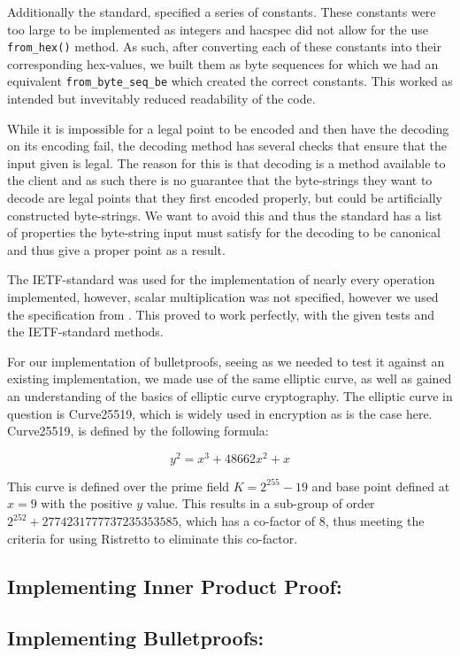 \documentclass{article}
\begin{document}
Additionally the standard, specified a series of constants. These
constants were too large to be implemented as integers and hacspec
did not allow for the use \texttt{from\_hex()} method. As such, after
converting each of these constants into their corresponding hex-values,
we built them as byte sequences for which we had an equivalent
\texttt{from\_byte\_seq\_be} which created the correct constants. This
worked as intended but invevitably reduced readability of the code.

While it is impossible for a legal point to be encoded and then have the
decoding on its encoding fail, the decoding method has several checks
that ensure that the input given is legal. The reason for this
is that decoding is a method available to the client and as such there
is no guarantee that the byte-strings they want to decode are legal
points that they first encoded properly, but could be artificially
constructed byte-strings. We want to avoid this and thus the standard
has a list of properties the byte-string input must satisfy for the
decoding to be canonical and thus give a proper point as a result.

The IETF-standard was used for the implementation of nearly every
operation implemented, however, scalar multiplication was not specified,
however we used the specification from \cite{elliptic-curves}. This proved to work perfectly, with the given tests and the
IETF-standard methods.

For our implementation of bulletproofs, seeing as we needed to test it
against an existing implementation, we made use of the same elliptic
curve, as well as gained an understanding of the basics of elliptic
curve cryptography. The elliptic curve in question is Curve25519, which
is widely used in encryption as is the case here. Curve25519, is defined by the following formula:

$$y^2 = x^3 + 48662x^2 + x$$

This curve is defined over the prime field $K = 2^{255} - 19$ and base
point defined at $x = 9$ with the positive $y$ value. This results in a
sub-group of order $2^{252} + 2774231777737235353585$, which has a
co-factor of $8$, thus meeting the criteria for using Ristretto to eliminate this co-factor.

\subsection{Implementing Inner Product Proof:}

\subsection{Implementing Bulletproofs:}
\end{document}
